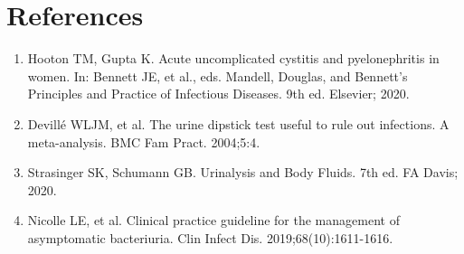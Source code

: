 \section*{References}
\begin{enumerate}
  \item Hooton TM, Gupta K. Acute uncomplicated cystitis and pyelonephritis in women. In: Bennett JE, et al., eds. Mandell, Douglas, and Bennett's Principles and Practice of Infectious Diseases. 9th ed. Elsevier; 2020.
  \item Devillé WLJM, et al. The urine dipstick test useful to rule out infections. A meta-analysis. BMC Fam Pract. 2004;5:4.
  \item Strasinger SK, Schumann GB. Urinalysis and Body Fluids. 7th ed. FA Davis; 2020.
  \item Nicolle LE, et al. Clinical practice guideline for the management of asymptomatic bacteriuria. Clin Infect Dis. 2019;68(10):1611-1616.
\end{enumerate}

\clearpage